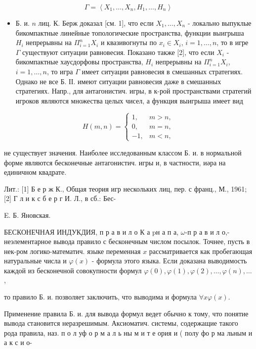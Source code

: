 \documentclass[10pt]{article}
\begin{document}
\[

\Gamma=\left\langle X_{1}, \ldots, X_{n}, H_{1}, \ldots, H_{n}\right\rangle

\]



\begin{itemize}

  \item Б. и. $n$ лиц. К. Берж доказал [см. 1], что если $X_{1}, \ldots, X_{n}$ - локально выпуклые бикомпактные линейные топологические пространства, функции выигрыша $H_{i}$ непрерывны на $\Pi_{i=1}^{n} X_{i}$ и квазивогнуты по $x_{i} \in X_{i}$, $i=1, \ldots, n$, то в игре $\Gamma$ существуют ситуации равновесия. Показано также [2], что если $X_{i}$ - бикомпактные хаусдорфовы пространства, $H_{i}$ непрерывны на $\Pi_{i=1}^{n} X_{i}$, $i=1, \ldots, n$, то игра $\Gamma$ имеет ситуации равновесия в смешанных стратегиях. Однако не все Б. ІІ. имеют ситуации равновесия даже в смешанных стратегиях. Напр., для антагонистич. игры, в к-рой пространствами стратегий игроков являются множества целых чисел, а функция выигрыша имеет вид

\end{itemize}



\[

H(m, n)=\left\{\begin{aligned}

1, & m>n, \\

0, & m=n, \\

-1, & m<n,

\end{aligned}\right.

\]



не существует значения. Наиболее исследованным классом Б. и. в нормальной форме являются бесконечные антагонистич. игры и, в частности, иәра на единичном квадрате.



Лит.: [1] Б е р ж К., Общая теория игр нескольких лиц, пер. с франц., М., 1961; [2] Г л и к с б е р г И. Л., в сб.: Бес-



E. Б. Яновская.



БЕСКОНЕЧНАЯ ИНДУКДИЯ, п р а в и л о К а pн а п а, $\omega$-п р а в и л о,- неэлементарное вывода правило с бесконечным числом посылок. Точнее, пусть в нек-ром логико-математич. языке переменная $x$ рассматривается как пробегающая натуральные числа и $\varphi(x)$ - формула этого языка. Если доказана выводимость каждой из бесконечной совокупности формул $\varphi(0), \varphi(1), \varphi(2), \ldots, \varphi(n), \ldots$,



то правило Б. и. позволяет заключить, что выводима и формула $\forall x \varphi(x)$.



Применение правила Б. и. для вывода формул ведет обычно к тому, что понятие вывода становится неразрешимым. Аксиоматич. системы, содержащие такого рода правила, наз. п о л уф о р м а л ь ны м и т е ория и ( полу фо р ма льным и а к с и о-
\end{document}
